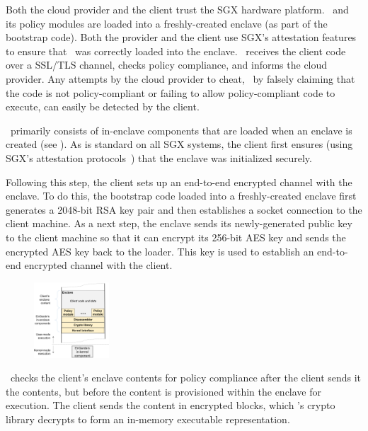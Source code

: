 Both the cloud provider and the client trust the SGX hardware platform. \tool\
and its policy modules are loaded into a freshly-created enclave (as part of
the bootstrap code). Both the provider and the client use SGX's attestation
features to ensure that \tool\ was correctly loaded into the enclave. \tool\
receives the client code over a SSL/TLS channel, checks policy compliance, and
informs the cloud provider. Any attempts by the cloud provider to cheat, \eg~by
falsely claiming that the code is not policy-compliant or failing to allow
policy-compliant code to execute, can easily be detected by the client.



%
\tool\ primarily consists of in-enclave components that are loaded when an
enclave is created (see ). As is standard on all
SGX systems, the client first ensures (using SGX's attestation
protocols~\cite{sgx:attest:hasp13}) that the enclave was initialized securely.

Following this step, the client sets up an end-to-end encrypted channel with
the enclave. To do this, the bootstrap code loaded into a freshly-created
enclave first generates a 2048-bit RSA key pair and then establishes a socket
connection to the client machine. As a next step, the enclave sends its
newly-generated public key to the client machine so that it can encrypt its
256-bit AES key and sends the encrypted AES key back to the loader. This key is
used to establish an end-to-end encrypted channel with the client.

\begin{figure}
\centering
\includegraphics[keepaspectratio=true,width=0.25\textwidth]{figures/engarde.png}
\indent\vspace{-0.3cm}
\mycaption{Design of \tool.}{\label{figure:overalldesign}}
\indent\vspace{-0.7cm}
\end{figure}

\tool\ checks the client's enclave contents for policy compliance after the
client sends it the contents, but before the content is provisioned within the
enclave for execution. The client sends the content in encrypted blocks, which
\tool's crypto library decrypts to form an in-memory executable representation.

